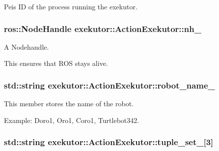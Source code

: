 \-Peis \-I\-D of the process running the exekutor. 

\hypertarget{classexekutor_1_1ActionExekutor_a1f0541608c4f27f3c72ab22b1874c882}{
\subsubsection[{nh\-\_\-}]{\setlength{\rightskip}{0pt plus 5cm}ros\-::\-Node\-Handle {\bf exekutor\-::\-Action\-Exekutor\-::nh\-\_\-}}}\label{classexekutor_1_1ActionExekutor_a1f0541608c4f27f3c72ab22b1874c882}


\-A \-Nodehandle. 

\-This ensures that \-R\-O\-S stays alive. \hypertarget{classexekutor_1_1ActionExekutor_af165894bbbbabd62c17be857be095936}{
\subsubsection[{robot\-\_\-name\-\_\-}]{\setlength{\rightskip}{0pt plus 5cm}std\-::string {\bf exekutor\-::\-Action\-Exekutor\-::robot\-\_\-name\-\_\-}}}\label{classexekutor_1_1ActionExekutor_af165894bbbbabd62c17be857be095936}


\-This member stores the name of the robot. 

\-Example\-: \-Doro1, \-Oro1, \-Coro1, \-Turtlebot342. \hypertarget{classexekutor_1_1ActionExekutor_a4407dd299ca8494945da306b6a367108}{
\subsubsection[{tuple\-\_\-set\-\_\-}]{\setlength{\rightskip}{0pt plus 5cm}std\-::string {\bf exekutor\-::\-Action\-Exekutor\-::tuple\-\_\-set\-\_\-}\mbox{[}3\mbox{]}}}\label{classexekutor_1_1ActionExekutor_a4407dd299ca8494945da306b6a367108}



